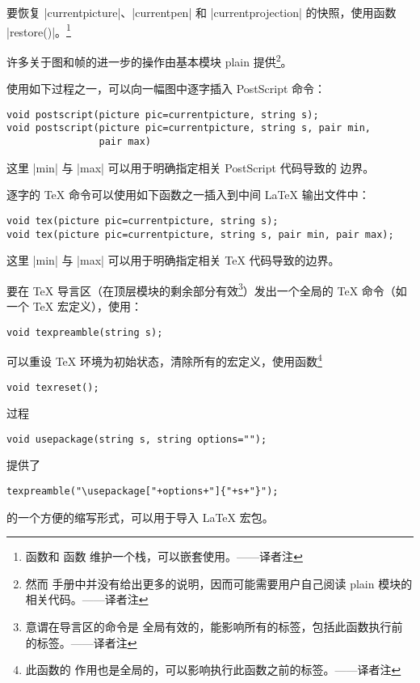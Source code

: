 \documentclass[nofonts,CJKnormalspaces]{ctexbook}[2009/05/20]
\makeatletter
\newenvironment{typelist}{\itemize
  \let\old@item\@item
  \def\@item[##1]{\expandafter\old@item[\ttfamily\color{type!50!black}##1]}}
{\enditemize}
\newcommand*\prgname[1]{\textsf{#1}}
\newcommand\transnote[1]{\footnote{#1——译者注}}
\makeatother
\begin{document}
\begin{typelist}
要恢复 |currentpicture|、|currentpen| 和 |currentprojection| 的快照，使用函数
|restore()|。\transnote{ 函数和  函数
维护一个栈，可以嵌套使用。}

许多关于图和帧的进一步的操作由基本模块 \prgname{plain} 提供\transnote{然而
手册中并没有给出更多的说明，因而可能需要用户自己阅读 \prgname{plain} 模块的
相关代码。}。

使用如下过程之一，可以向一幅图中逐字插入 \prgname{PostScript} 命令：
\begin{lstlisting}
void postscript(picture pic=currentpicture, string s);
void postscript(picture pic=currentpicture, string s, pair min,
                pair max)
\end{lstlisting}
这里 |min| 与 |max| 可以用于明确指定相关 \prgname{PostScript} 代码导致的
边界。

逐字的 \TeX{} 命令可以使用如下函数之一插入到中间 \LaTeX{} 输出文件中：
\begin{lstlisting}
void tex(picture pic=currentpicture, string s);
void tex(picture pic=currentpicture, string s, pair min, pair max);
\end{lstlisting}
这里 |min| 与 |max| 可以用于明确指定相关 \TeX{} 代码导致的边界。

要在 \TeX{} 导言区（在顶层模块的剩余部分有效\transnote{意谓在导言区的命令是
全局有效的，能影响所有的标签，包括此函数执行前的标签。}）发出一个全局的
\TeX{} 命令（如一个 \TeX{} 宏定义），使用：
\begin{lstlisting}
void texpreamble(string s);
\end{lstlisting}

可以重设 \TeX{} 环境为初始状态，清除所有的宏定义，使用函数\transnote{此函数的
作用也是全局的，可以影响执行此函数之前的标签。}
\begin{lstlisting}
void texreset();
\end{lstlisting}

过程
\begin{lstlisting}
void usepackage(string s, string options="");
\end{lstlisting}
提供了
\begin{lstlisting}
texpreamble("\usepackage["+options+"]{"+s+"}");
\end{lstlisting}
的一个方便的缩写形式，可以用于导入 \LaTeX{} 宏包。

\end{typelist}
\end{document}
